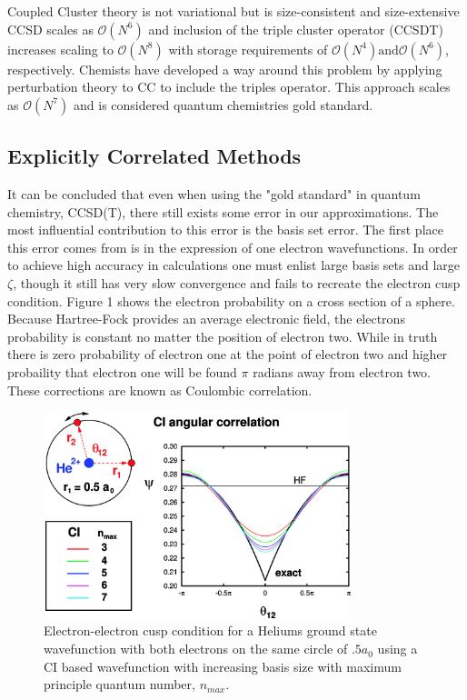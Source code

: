       Coupled Cluster theory is not variational but is size-consistent and size-extensive %
      CCSD scales as $\mathcal{O}(N^6)$ and inclusion of the triple cluster operator (CCSDT) increases scaling to $\mathcal{O}(N^8)$\cite{Noga 1987, Scuseria 1988} with storage requirements of $\mathcal{O}(N^4) \text {and} \mathcal{O}(N^6)$, respectively. Chemists have developed a way around this problem by applying perturbation theory to CC to include the triples operator\cite{Crawford2000}.%
      This approach scales as $\mathcal{O}(N^7)$ and is considered quantum chemistries gold standard.
  \subsection{Explicitly Correlated Methods}
    It can be concluded that even when using the "gold standard" in quantum chemistry, CCSD(T), there still exists some error in our approximations.  The most influential contribution to this error is the basis set error.  The first place this error comes from is in the expression of one electron wavefunctions.  In order to achieve high accuracy in calculations one must enlist large basis sets and large $\zeta$, though it still has very slow convergence and fails to recreate the electron cusp condition.  Figure 1 shows the electron probability on a cross section of a sphere.  Because Hartree-Fock provides an average electronic field, the electrons probability is constant no matter the position of electron two.  While in truth there is zero probability of electron one at the point of electron two and higher probaility that electron one will be found $\pi$ radians away from electron two.  These corrections are known as Coulombic correlation. 
    \begin{figure}[H]
      \centering
        \includegraphics[width = 9cm, height = 6cm]{./pics/ang.jpeg}
        \caption{Electron-electron cusp condition for a Heliums ground state wavefunction with both electrons on the same circle of $.5 a_0$ using a CI based wavefunction with increasing basis size with maximum principle quantum number, $n_{max}$\cite{Hatting 2012}.}
    \end{figure}
